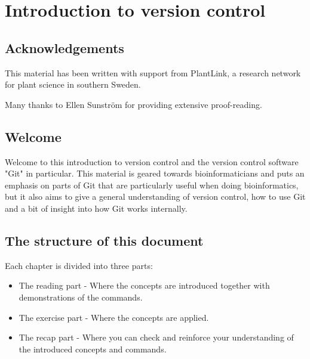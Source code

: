 \documentclass[../main/git_course_main.tex]{subfiles}
\begin{document}
\setcounter{chapter}{0}
\chapter{Introduction to version control}

\section{Acknowledgements}

This material has been written with support from PlantLink, a research network for plant science in southern Sweden.

Many thanks to Ellen Sunström for providing extensive proof-reading.

%
%


\section{Welcome}

Welcome to this introduction to version control and the version control software "Git" in particular. This material is geared towards bioinformaticians and puts an emphasis on parts
of Git that are particularly useful when doing bioinformatics, but it also aims to give a general understanding of version control, how to use Git and a bit of insight into how Git works internally.

\section{The structure of this document}


Each chapter is divided into three parts:

\begin{itemize}
	\item The reading part - Where the concepts are introduced together with demonstrations of the commands.
	\item The exercise part - Where the concepts are applied.
	\item The recap part - Where you can check and reinforce your understanding of the introduced concepts and commands.
\end{itemize}
\end{document}
